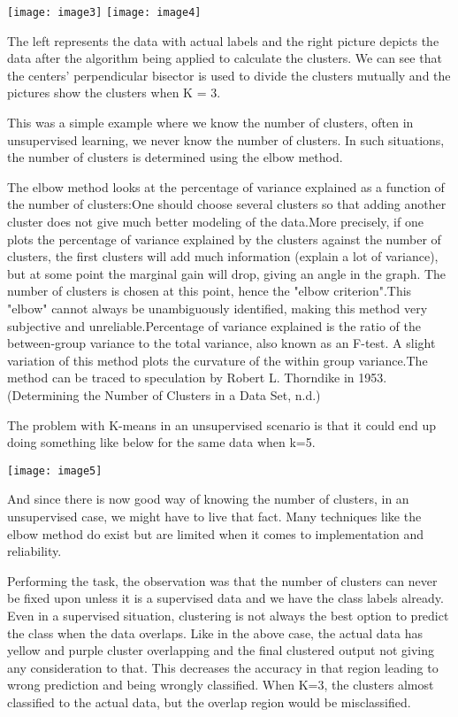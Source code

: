\documentclass{article} %
\begin{document}
\noindent \texttt{[image: image3]} \texttt{[image: image4]}

\noindent The left represents the data with actual labels and the right picture depicts the data after the algorithm being applied to calculate the clusters. We can see that the centers' perpendicular bisector is used to divide the clusters mutually and the pictures show the clusters when K = 3. 

\noindent This was a simple example where we know the number of clusters, often in unsupervised learning, we never know the number of clusters. In such situations, the number of clusters is determined using the elbow method.

\noindent The elbow method looks at the percentage of variance explained as a function of the number of clusters:One should choose several clusters so that adding another cluster does not give much better modeling of the data.More precisely, if one plots the percentage of variance explained by the clusters against the number of clusters, the first clusters will add much information (explain a lot of variance), but at some point the marginal gain will drop, giving an angle in the graph. The number of clusters is chosen at this point, hence the "elbow criterion".This "elbow" cannot always be unambiguously identified, making this method very subjective and unreliable.Percentage of variance explained is the ratio of the between-group variance to the total variance, also known as an F-test. A slight variation of this method plots the curvature of the within group variance.The method can be traced to speculation by Robert L. Thorndike in 1953. (Determining the Number of Clusters in a Data Set, n.d.)

\noindent The problem with K-means in an unsupervised scenario is that it could end up doing something like below for the same data when k=5.

\noindent \texttt{[image: image5]}

\noindent And since there is now good way of knowing the number of clusters, in an unsupervised case, we might have to live that fact. Many techniques like the elbow method do exist but are limited when it comes to implementation and reliability. 

\noindent Performing the task, the observation was that the number of clusters can never be fixed upon unless it is a supervised data and we have the class labels already. Even in a supervised situation, clustering is not always the best option to predict the class when the data overlaps. Like in the above case, the actual data has yellow and purple cluster overlapping and the final clustered output not giving any consideration to that. This decreases the accuracy in that region leading to wrong prediction and being wrongly classified. When K=3, the clusters almost classified to the actual data, but the overlap region would be misclassified. 
\end{document}
